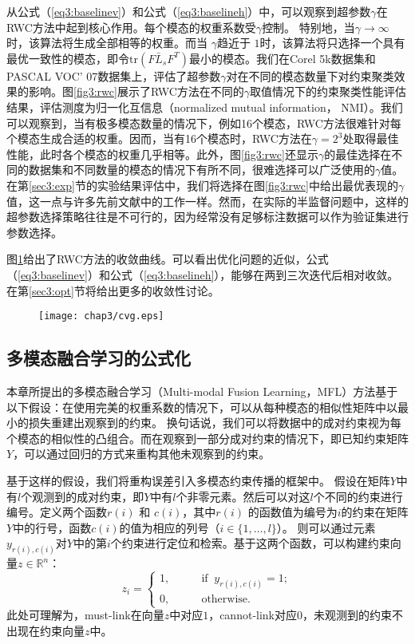 从公式（\ref{eq3:baselinev}）和公式（\ref{eq3:baselineh}）中，可以观察到超参数$ \gamma $在RWC方法中起到核心作用。每个模态的权重系数受$ \gamma $控制。 特别地，当$ \gamma \rightarrow \infty$时，该算法将生成全部相等的权重。而当 $ \gamma $趋近于 $ 1 $时，该算法将只选择一个具有最优一致性的模态，即令$  \mathrm{tr}({F} \bar{{L}}_s{F}^T) $最小的模态。我们在Corel 5k数据集和PASCAL VOC' 07数据集上，评估了超参数$\gamma$对在不同的模态数量下对约束聚类效果的影响。图\ref{fig3:rwc}展示了RWC方法在不同的$\gamma$取值情况下的约束聚类性能评估结果，评估测度为归一化互信息（normalized mutual information， NMI）。我们可以观察到，当有极多模态数量的情况下，例如16个模态，RWC方法很难针对每个模态生成合适的权重。因而，当有16个模态时，RWC方法在$ \gamma = 2^3 $处取得最佳性能，此时各个模态的权重几乎相等。此外，图\ref{fig3:rwc}还显示$\gamma$的最佳选择在不同的数据集和不同数量的模态的情况下有所不同，很难选择可以广泛使用的$\gamma$值。在第\ref{sec3:exp}节的实验结果评估中，我们将选择在图\ref{fig3:rwc}中给出最优表现的$ \gamma $值，这一点与许多先前文献中的工作一样。然而，在实际的半监督问题中，这样的超参数选择策略往往是不可行的，因为经常没有足够标注数据可以作为验证集进行参数选择。

图\ref{fig3:cvg}给出了RWC方法的收敛曲线。可以看出优化问题的近似，公式（\ref{eq3:baselinev}）和公式（\ref{eq3:baselineh}），能够在两到三次迭代后相对收敛。在第\ref{sec3:opt}节将给出更多的收敛性讨论。

\begin{figure}[t]
	\centering
	\texttt{[image: chap3/cvg.eps]}
	\label{fig3:cvg}
\end{figure}

\subsection{多模态融合学习的公式化}
本章所提出的多模态融合学习（Multi-modal Fusion Learning，MFL）方法基于以下假设：在使用完美的权重系数的情况下，可以从每种模态的相似性矩阵中以最小的损失重建出观察到的约束。 换句话说，我们可以将数据中的成对约束视为每个模态的相似性的凸组合。而在观察到一部分成对约束的情况下，即已知约束矩阵$Y$，可以通过回归的方式来重构其他未观察到的约束。

基于这样的假设，我们将重构误差引入多模态约束传播的框架中。
假设在矩阵$Y$中有$l$个观测到的成对约束，即$Y$中有$l$个非零元素。然后可以对这$l$个不同的约束进行编号。定义两个函数$ r(i) $ 和 $ c(i) $，其中$ r(i) $ 的函数值为编号为$i$的约束在矩阵$Y$中的行号，函数$ c(i) $的值为相应的列号（$i \in \{1,\dots,l\}$）。
则可以通过元素$ y_{r(i),c(i)} $对$Y$中的第$i$个约束进行定位和检索。基于这两个函数，可以构建约束向量$ {z} \in \mathbb{R}^n$：
\begin{equation}
z_i = \begin{cases}1,\quad\quad &\text{if}\;\; y_{r(i),c(i)} =1; \\
0, \quad\quad &\text{otherwise}.
\end{cases}
\end{equation} 
此处可理解为，must-link在向量$z$中对应$1$，cannot-link对应$0$，未观测到的约束不出现在约束向量$z$中。

